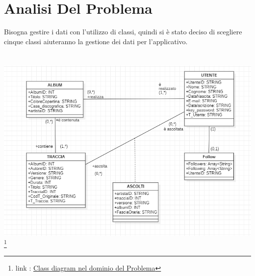 \documentclass[11pt]{article}
\begin{document}
	\section{Analisi Del Problema}
	Bisogna gestire i dati con l'utilizzo di classi, quindi si è stato deciso di scegliere cinque classi aiuteranno la gestione dei dati per
	l'applicativo.
	\\
	\\
	\\
	\includegraphics[width=0.8\linewidth]{Dominio del Problema.png} \footnote{link : \href{https://github.com/torcy-it/PROGETTO-BD-OO}{Class diagram nel dominio del Problema}}




	\clearpage
	
\end{document}
